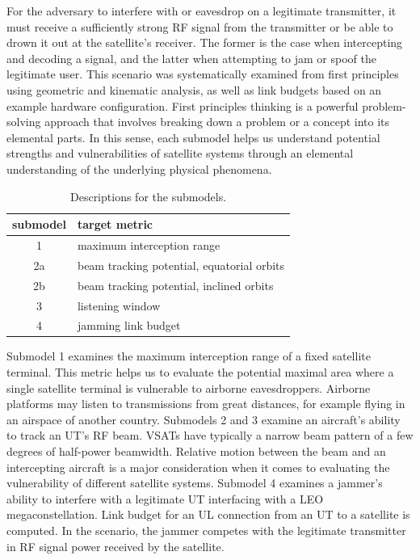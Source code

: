 \documentclass[english, 12pt, a4paper, elec, utf8, a-1b, online]{aaltothesis}
\begin{document}
For the adversary to interfere with or eavesdrop on a legitimate transmitter, it must receive a sufficiently strong RF signal from the transmitter or be able to drown it out at the satellite's receiver.
The former is the case when intercepting and decoding a signal, and the latter when attempting to jam or spoof the legitimate user.
This scenario was systematically examined from first principles using geometric and kinematic analysis, as well as link budgets based on an example hardware configuration.
First principles thinking is a powerful problem-solving approach that involves breaking down a problem or a concept into its elemental parts.
In this sense, each submodel helps us understand potential strengths and vulnerabilities of satellite systems through an elemental understanding of the underlying physical phenomena.

\begin{table}[h]
  \centering
  \caption{Descriptions for the submodels.}
  \begin{tabular}{@{}cl@{}}
  \toprule
  \multicolumn{1}{l}{submodel}  & target metric                              \\ \midrule
  1                             & maximum interception range                 \\
  2a                            & beam tracking potential, equatorial orbits \\
  2b                            & beam tracking potential, inclined orbits   \\
  3                             & listening window                           \\
  4                             & jamming link budget                        \\ \bottomrule
  \end{tabular}
  \label{table-submodel-descriptions}
\end{table}

Submodel 1 examines the maximum interception range of a fixed satellite terminal.
This metric helps us to evaluate the potential maximal area where a single satellite terminal is vulnerable to airborne eavesdroppers.
Airborne platforms may listen to transmissions from great distances, for example flying in an airspace of another country.
Submodels 2 and 3 examine an aircraft's ability to track an UT's RF beam.
VSATs have typically a narrow beam pattern of a few degrees of half-power beamwidth.
Relative motion between the beam and an intercepting aircraft is a major consideration when it comes to evaluating the vulnerability of different satellite systems.
Submodel 4 examines a jammer's ability to interfere with a legitimate UT interfacing with a LEO megaconstellation.
Link budget for an UL connection from an UT to a satellite is computed.
In the scenario, the jammer competes with the legitimate transmitter in RF signal power received by the satellite.
\end{document}
